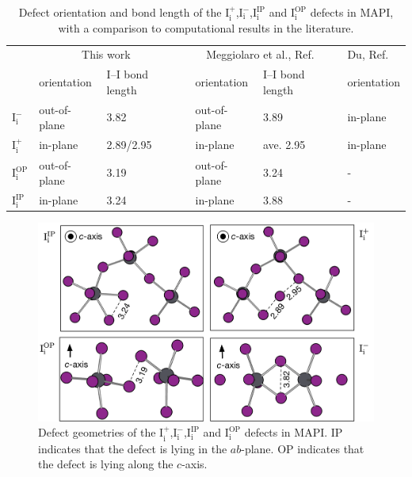 \begin{table}[h!]\centering
\begin{tabular}{llllllll}\toprule
\phantom{abcd}&\multicolumn{2}{c}{This work} &\phantom{a} &\multicolumn{2}{c}{Meggiolaro et al., Ref. \cite{Meggiolaro2018}}&\phantom{a} & Du, Ref. \cite{Du2015} \\
\cline{2-3} \cline{5-6} \cline{8-8}
& orientation & I--I bond length && orientation & I--I bond length && orientation \\  
\midrule
$\mathrm{I}_\mathrm{i}^-$ &  out-of-plane & 3.82  &&  out-of-plane & 3.89 && in-plane \\
$\mathrm{I}_\mathrm{i}^+$ & in-plane & 2.89/2.95 && in-plane & ave. 2.95 && in-plane \\
$\mathrm{I}_\mathrm{i}^\mathrm{OP}$ & out-of-plane & 3.19 && out-of-plane & 3.24 && - \\
$\mathrm{I}_\mathrm{i}^\mathrm{IP}$ & in-plane & 3.24 && in-plane & 3.88 && - \\
\end{tabular} 
\caption[Defect orientation and bond length of the $\mathrm{I}_\mathrm{i}^+$,$\mathrm{I}_\mathrm{i}^-$,$\mathrm{I}_\mathrm{i}^\mathrm{IP}$ and $\mathrm{I}_\mathrm{i}^\mathrm{OP}$ defects in MAPI]{Defect orientation and bond length of the $\mathrm{I}_\mathrm{i}^+$,$\mathrm{I}_\mathrm{i}^-$,$\mathrm{I}_\mathrm{i}^\mathrm{IP}$ and $\mathrm{I}_\mathrm{i}^\mathrm{OP}$ defects in MAPI, with a comparison to computational results in the literature. }
\end{table}

\begin{figure}[h!]
\centering
  \includegraphics[width=1.0\columnwidth]{figures/ch6/defect_geometries.png}
  \caption[Defect geometries of the $\mathrm{I}_\mathrm{i}^+$,$\mathrm{I}_\mathrm{i}^-$,$\mathrm{I}_\mathrm{i}^\mathrm{IP}$ and $\mathrm{I}_\mathrm{i}^\mathrm{OP}$ defects in MAPI]{Defect geometries of the $\mathrm{I}_\mathrm{i}^+$,$\mathrm{I}_\mathrm{i}^-$,$\mathrm{I}_\mathrm{i}^\mathrm{IP}$ and $\mathrm{I}_\mathrm{i}^\mathrm{OP}$ defects in MAPI. IP indicates that the defect is lying in the $ab$-plane. OP indicates that the defect is lying along the $c$-axis.}
\label{relaxation_workflow}
\end{figure}

